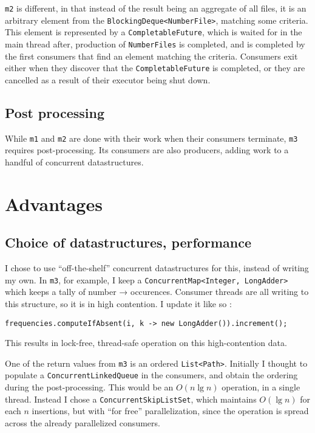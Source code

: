 \documentclass[a4paper,11pt]{article}
\begin{document}
\texttt{m2} is different, in that instead of the result being an
aggregate of all files, it is an arbitrary element from the
\texttt{BlockingDeque<NumberFile>}, matching some criteria.  This
element is represented by a \texttt{CompletableFuture}, which is
waited for in the main thread after, production of
\texttt{NumberFiles} is completed, and is completed by the first
consumers that find an element matching the criteria.  Consumers exit
either when they discover that the \texttt{CompletableFuture} is
completed, or they are cancelled as a result of their executor being
shut down.

\subsection{Post processing}

While \texttt{m1} and \texttt{m2} are done with their work when their
consumers terminate, \texttt{m3} requires post-processing.  Its
consumers are also producers, adding work to a handful of concurrent
datastructures.   

\section{Advantages}

\subsection{Choice of datastructures, performance}

I chose to use ``off-the-shelf'' concurrent datastructures for this,
instead of writing my own.  In \texttt{m3}, for example, I keep a
\texttt{ConcurrentMap<Integer, LongAdder>} which keeps a tally of
number → occurences.  Consumer threads are all writing to this
structure, so it is in high contention.  I update it like so
:

\begin{verbatim}
frequencies.computeIfAbsent(i, k -> new LongAdder()).increment();
\end{verbatim}

This results in lock-free, thread-safe operation on this
high-contention data.

One of the return values from \texttt{m3} is an ordered
\texttt{List<Path>}.  Initially I thought to populate a
\texttt{ConcurrentLinkedQueue} in the consumers, and obtain the
ordering during the post-processing.  This would be an \(O(n \lg n) \)
operation, in a single thread.  Instead I chose a
\texttt{ConcurrentSkipListSet}, which maintains $O(\lg n)$ for each
$n$ insertions, but with ``for free'' parallelization, since the
operation is spread across the already parallelized consumers.
\end{document}
